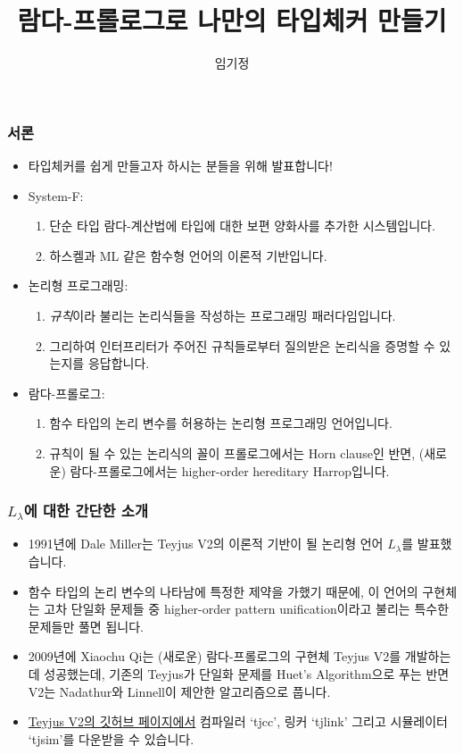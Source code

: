 \documentclass[slidestop,compress,mathserif]{beamer}
\title{람다-프롤로그로 나만의 타입체커 만들기}
\author{임기정}
\begin{document}
    \begin{frame}
        \titlepage
    \end{frame}

    \begin{frame}
        \frametitle{서론}
        \begin{itemize}
            \item 타입체커를 쉽게 만들고자 하시는 분들을 위해 발표합니다!
            \pause
            \item System-F:
            \begin{enumerate}
                \item 단순 타입 람다-계산법에 타입에 대한 보편 양화사를 추가한 시스템입니다.
                \item 하스켈과 ML 같은 함수형 언어의 이론적 기반입니다.
            \end{enumerate}
            \pause
            \item 논리형 프로그래밍:
            \begin{enumerate}
                \item \textit{규칙}이라 불리는 논리식들을 작성하는 프로그래밍 패러다임입니다.
                \item 그리하여 인터프리터가 주어진 규칙들로부터 질의받은 논리식을 증명할 수 있는지를 응답합니다.
            \end{enumerate}
            \pause
            \item 람다-프롤로그:
            \begin{enumerate}
                \item 함수 타입의 논리 변수를 허용하는 논리형 프로그래밍 언어입니다.
                \item 규칙이 될 수 있는 논리식의 꼴이 프롤로그에서는 Horn clause인 반면, (새로운) 람다-프롤로그에서는 higher-order hereditary Harrop입니다.
            \end{enumerate}
        \end{itemize}
    \end{frame}

    \begin{frame}
        \frametitle{$L_\lambda$에 대한 간단한 소개}
        \begin{itemize}
            \item 1991년에 Dale Miller는 Teyjus V2의 이론적 기반이 될 논리형 언어 $L_\lambda$를 발표했습니다.
            \item 함수 타입의 논리 변수의 나타남에 특정한 제약을 가했기 때문에, 이 언어의 구현체는 고차 단일화 문제들 중 higher-order pattern unification이라고 불리는 특수한 문제들만 풀면 됩니다.
            \item 2009년에 Xiaochu Qi는 (새로운) 람다-프롤로그의 구현체 Teyjus V2를 개발하는 데 성공했는데, 기존의 Teyjus가 단일화 문제를 Huet's Algorithm으로 푸는 반면 V2는 Nadathur와 Linnell이 제안한 알고리즘으로 풉니다.
            \item \href{https://github.com/teyjus/teyjus/releases}{Teyjus V2의 깃허브 페이지에서} 컴파일러 `tjcc', 링커 `tjlink' 그리고 시뮬레이터 `tjsim'를 다운받을 수 있습니다.
        \end{itemize}
    \end{frame}
\end{document}
